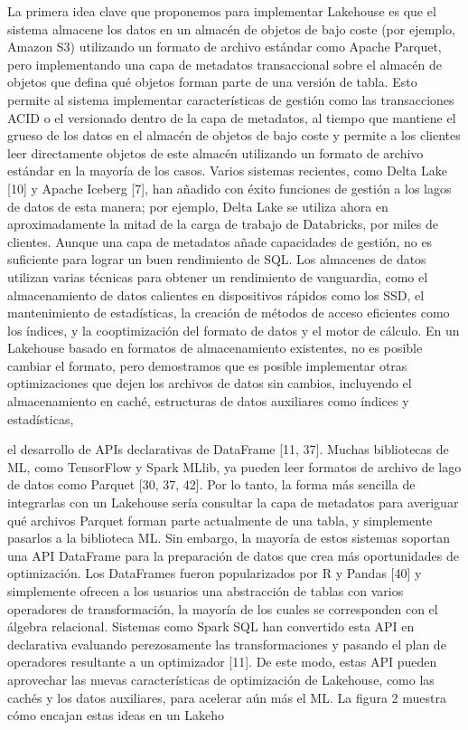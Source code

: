 La primera idea clave que proponemos para implementar Lakehouse es que el sistema almacene los datos en un almacén de objetos de bajo coste (por ejemplo, Amazon S3) utilizando un formato de archivo estándar como Apache Parquet, pero implementando una capa de metadatos transaccional sobre el almacén de objetos que defina qué objetos forman parte de una versión de tabla. Esto permite al sistema implementar características de gestión como las transacciones ACID o el versionado dentro de la capa de metadatos, al tiempo que mantiene el grueso de los datos en el almacén de objetos de bajo coste y permite a los clientes leer directamente objetos de este almacén utilizando un formato de archivo estándar en la mayoría de los casos. Varios sistemas recientes, como Delta Lake [10] y Apache Iceberg [7], han añadido con éxito funciones de gestión a los lagos de datos de esta manera; por ejemplo, Delta Lake se utiliza ahora en aproximadamente la mitad de la carga de trabajo de Databricks, por miles de clientes. Aunque una capa de metadatos añade capacidades de gestión, no es suficiente para lograr un buen rendimiento de SQL. Los almacenes de datos utilizan varias técnicas para obtener un rendimiento de vanguardia, como el almacenamiento de datos calientes en dispositivos rápidos como los SSD, el mantenimiento de estadísticas, la creación de métodos de acceso eficientes como los índices, y la cooptimización del formato de datos y el motor de cálculo. En un Lakehouse basado en formatos de almacenamiento existentes, no es posible cambiar el formato, pero demostramos que es posible implementar otras optimizaciones que dejen los archivos de datos sin cambios, incluyendo el almacenamiento en caché, estructuras de datos auxiliares como índices y estadísticas,

el desarrollo de APIs declarativas de DataFrame [11, 37]. Muchas bibliotecas de ML, como TensorFlow y Spark MLlib, ya pueden leer formatos de archivo de lago de datos como Parquet [30, 37, 42]. Por lo tanto, la forma más sencilla de integrarlas con un Lakehouse sería consultar la capa de metadatos para averiguar qué archivos Parquet forman parte actualmente de una tabla, y simplemente pasarlos a la biblioteca ML. Sin embargo, la mayoría de estos sistemas soportan una API DataFrame para la preparación de datos que crea más oportunidades de optimización. Los DataFrames fueron popularizados por R y Pandas [40] y simplemente ofrecen a los usuarios una abstracción de tablas con varios operadores de transformación, la mayoría de los cuales se corresponden con el álgebra relacional. Sistemas como Spark SQL han convertido esta API en declarativa evaluando perezosamente las transformaciones y pasando el plan de operadores resultante a un optimizador [11]. De este modo, estas API pueden aprovechar las nuevas características de optimización de Lakehouse, como las cachés y los datos auxiliares, para acelerar aún más el ML. La figura 2 muestra cómo encajan estas ideas en un Lakeho

